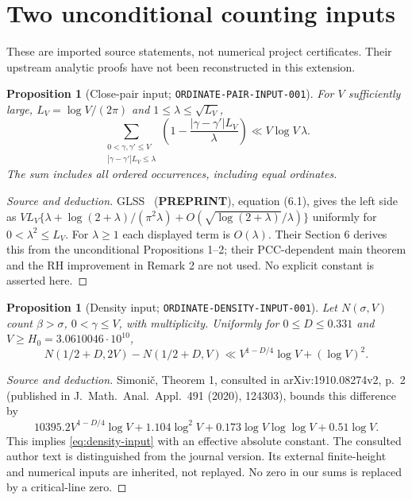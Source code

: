\documentclass[11pt]{article}
\newtheorem{proposition}[lemma]{Proposition}
\begin{document}
\section{Two unconditional counting inputs}
These are imported source statements, not numerical project certificates.
Their upstream analytic proofs have not been reconstructed in this extension.

\begin{proposition}[Close-pair input; \texttt{ORDINATE-PAIR-INPUT-001}]
\label{prop:pair-input}
For $V$ sufficiently large, $L_V=\log V/(2\pi)$ and
$1\leq\lambda\leq\sqrt{L_V}$,
\begin{equation}\label{eq:pair-input}
 \sum_{\substack{0<\gamma,\gamma'\leq V\\
                  |\gamma-\gamma'|L_V\leq\lambda}}
 \left(1-\frac{|\gamma-\gamma'|L_V}{\lambda}\right)
 \ll V\log V\,\lambda.
\end{equation}
The sum includes all ordered occurrences, including equal ordinates.
\end{proposition}
\begin{proof}[Source and deduction]
GLSS~\cite{GLSS} (\textbf{PREPRINT}), equation (6.1), gives the left side as
$VL_V\{\lambda+\log(2+\lambda)/(\pi^2\lambda)
+O(\sqrt{\log(2+\lambda)}/\lambda)\}$ uniformly for
$0<\lambda^2\leq L_V$. For $\lambda\geq1$ each displayed term is
$O(\lambda)$. Their Section 6 derives this from the unconditional
Propositions 1--2; their PCC-dependent main theorem and the RH improvement
in Remark 2 are not used. No explicit constant is asserted here.
\end{proof}

\begin{proposition}[Density input; \texttt{ORDINATE-DENSITY-INPUT-001}]
\label{prop:density-input}
Let $N(\sigma,V)$ count $\beta>\sigma$, $0<\gamma\leq V$, with
multiplicity. Uniformly for $0\leq D\leq0.331$ and
$V\geq H_0=3.0610046\cdot10^{10}$,
\begin{equation}\label{eq:density-input}
 N(1/2+D,2V)-N(1/2+D,V)
 \ll V^{1-D/4}\log V+(\log V)^2.
\end{equation}
\end{proposition}
\begin{proof}[Source and deduction]
Simoni\v c, Theorem 1, consulted in arXiv:1910.08274v2, p.~2
(published in J.~Math.~Anal.~Appl.~491 (2020), 124303), bounds this
difference by
\[
10395.2 V^{1-D/4}\log V+1.104\log^2V+
0.173\log V\log\log V+0.51\log V.
\]
This implies \eqref{eq:density-input} with an effective absolute constant.
The consulted author text is distinguished from the journal version.
Its external finite-height and numerical inputs are inherited, not replayed.
No zero in our sums is replaced by a critical-line zero.
\end{proof}
\end{document}
